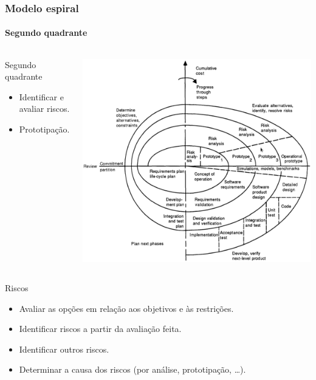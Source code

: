 \begin{frame}
	\frametitle{Modelo espiral}
	\framesubtitle{Segundo quadrante}

	\begin{columns}
		\begin{block:fact}{Segundo quadrante}
			\begin{itemize}
				\item Identificar e avaliar riscos.
				\item Prototipação.
			\end{itemize}
		\end{block:fact}

		\begin{block:fact}{}
			\centering
			\includegraphics[width=.8\textwidth]{software-engineering/project-management/process/sdlc/spiral/spiral}
		\end{block:fact}
	\end{columns}
	
	\begin{block:fact}{Riscos}
		\begin{itemize}
			\item Avaliar as opções em relação aos objetivos e às restrições.
			\item Identificar riscos a partir da avaliação feita.
			\item Identificar outros riscos.
			\item Determinar a causa dos riscos (por análise, prototipação, \ldots).
		\end{itemize}
	\end{block:fact}


\end{frame}
